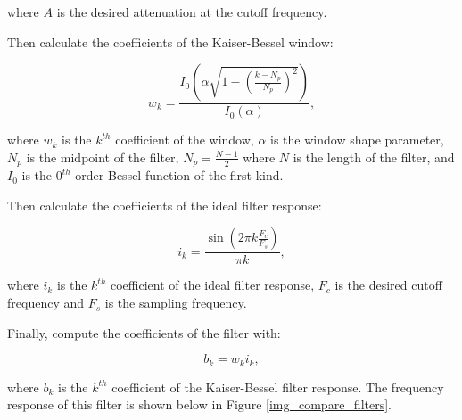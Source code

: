                 where $A$ is the desired attenuation at the cutoff frequency.

                Then calculate the coefficients of the Kaiser-Bessel window:

                \begin{equation}
                w_k = \frac{I_0(\alpha \sqrt{1 - (\frac{k - N_p}{N_p})^2})}{I_0(\alpha)},
                \end{equation}

                where $w_k$ is the $k^{th}$ coefficient of the window, $\alpha$ is the window shape parameter, $N_p$ is the midpoint of the filter, $N_p = \frac{N-1}{2}$ where $N$ is the length of the filter, and $I_0$ is the $0^{th}$ order Bessel function of the first kind.

                Then calculate the coefficients of the ideal filter response:

                \begin{equation}
                i_k = \frac{\sin(2\pi k\frac{F_c}{F_s})}{\pi k},
                \end{equation}

                where $i_k$ is the $k^{th}$ coefficient of the ideal filter response, $F_c$ is the desired cutoff frequency and $F_s$ is the sampling frequency.

                Finally, compute the coefficients of the filter with: 

                \begin{equation}
                b_k = w_ki_k,
                \end{equation}

                where $b_k$ is the $k^{th}$ coefficient of the Kaiser-Bessel filter response. The frequency response of this filter is shown below in Figure \ref{img_compare_filters}.

